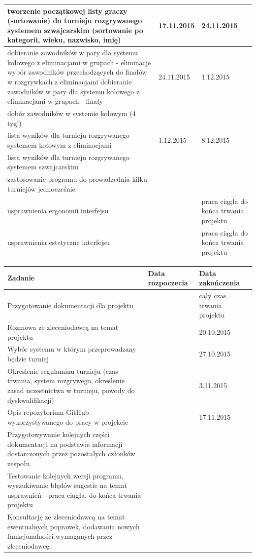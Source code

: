 \begin{tabular}{|p{9cm}|l|p{3cm}|}
tworzenie początkowej listy graczy (sortowanie) do turnieju rozgrywanego systemem szwajcarskim (sortowanie po kategorii, wieku, nazwisko, imię)&17.11.2015&24.11.2015\\ \hline
dobieranie zawodników w pary dla systemu kołowego z eliminacjami w grupach - eliminacje
wybór zawodników przechodzących do finałów w rozgrywkach z eliminacjami
dobieranie zawodników w pary dla systemu kołowego z eliminacjami w grupach - finały&24.11.2015&1.12.2015\\ \hline
dobór zawodników w systemie kołowym (4 tyg!)&&\\ \hline 
lista wyników dla turnieju rozgrywanego systemem kołowym z eliminacjami&1.12.2015&8.12.2015\\ \hline
lista wyników dla turnieju rozgrywanego systemem szwajcarskim&&\\ \hline 
zastosowanie programu do prowadzednia kilku turniejów jednocześnie&&\\ \hline
usprawnienia ergonomii interfejsu&&praca ciągła do końca trwania projektu\\ \hline
usprawnienia estetyczne interfejsu&&praca ciągła do końca trwania projektu\\ \hline

\end{tabular}

\begin{tabular}{|p{9cm}|l|p{3cm}|} \hline
Zadanie & Data rozpoczecia & Data zakończenia\\ \hline
Przygotowanie dokumentacji dla projektu&&cały czas trwania projektu\\ \hline
Rozmowa ze zleceniodawcą na temat projektu &&20.10.2015\\ \hline
Wybór systemu w którym przeprowadzany będzie turniej &&27.10.2015\\ \hline
Okreslenie regulaminu turnieju (czas trwania,  system rozgrywego, określenie zasad uczestnictwa w turnieju, powody do dyskwalifikacji) &&3.11.2015\\ \hline
Opis repozytorium GitHub wykorzystywanego do pracy w projekcie &&17.11.2015\\ \hline
Przygotowywanie kolejnych części dokumentacji na podstawie informacji dostarczonych przez pozostałych członków zespołu&&\\ \hline
Testowanie kolejnych wersji  programu, wyszukiwanie błędów sugestie na temat usprawnień - praca ciągła, do końca trwania projektu&&\\ \hline
Konsultację ze zleceniodawcą na temat ewentualnych poprawek, dodawania nowych funkcjonalności wymaganych przez zleceniodawcę.&&\\ \hline 
\end{tabular}

